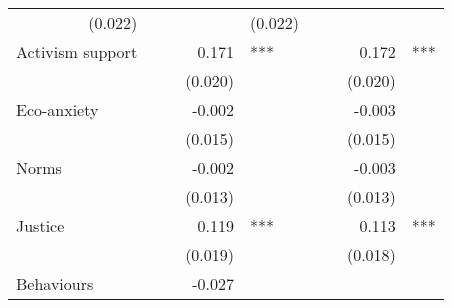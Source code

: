 \documentclass{article}
\begin{document}
\begin{table}[!h]
\begin{tabular}{lllllllll}
  \multicolumn{1}{r}{(0.022)} &
  \multicolumn{1}{l}{} &
  \multicolumn{1}{r}{} &
  \multicolumn{1}{l}{} &
  \multicolumn{1}{r}{(0.022)} &
  \multicolumn{1}{l}{} \\
\multicolumn{1}{l}{Activism support} &
  \multicolumn{1}{r}{} &
  \multicolumn{1}{l}{} &
  \multicolumn{1}{r}{0.171} &
  \multicolumn{1}{l}{***} &
  \multicolumn{1}{r}{} &
  \multicolumn{1}{l}{} &
  \multicolumn{1}{r}{0.172} &
  \multicolumn{1}{l}{***} \\
\multicolumn{1}{l}{} &
  \multicolumn{1}{r}{} &
  \multicolumn{1}{l}{} &
  \multicolumn{1}{r}{(0.020)} &
  \multicolumn{1}{l}{} &
  \multicolumn{1}{r}{} &
  \multicolumn{1}{l}{} &
  \multicolumn{1}{r}{(0.020)} &
  \multicolumn{1}{l}{} \\
\multicolumn{1}{l}{Eco-anxiety} &
  \multicolumn{1}{r}{} &
  \multicolumn{1}{l}{} &
  \multicolumn{1}{r}{-0.002} &
  \multicolumn{1}{l}{} &
  \multicolumn{1}{r}{} &
  \multicolumn{1}{l}{} &
  \multicolumn{1}{r}{-0.003} &
  \multicolumn{1}{l}{} \\
\multicolumn{1}{l}{} &
  \multicolumn{1}{r}{} &
  \multicolumn{1}{l}{} &
  \multicolumn{1}{r}{(0.015)} &
  \multicolumn{1}{l}{} &
  \multicolumn{1}{r}{} &
  \multicolumn{1}{l}{} &
  \multicolumn{1}{r}{(0.015)} &
  \multicolumn{1}{l}{} \\
\multicolumn{1}{l}{Norms} &
  \multicolumn{1}{r}{} &
  \multicolumn{1}{l}{} &
  \multicolumn{1}{r}{-0.002} &
  \multicolumn{1}{l}{} &
  \multicolumn{1}{r}{} &
  \multicolumn{1}{l}{} &
  \multicolumn{1}{r}{-0.003} &
  \multicolumn{1}{l}{} \\
\multicolumn{1}{l}{} &
  \multicolumn{1}{r}{} &
  \multicolumn{1}{l}{} &
  \multicolumn{1}{r}{(0.013)} &
  \multicolumn{1}{l}{} &
  \multicolumn{1}{r}{} &
  \multicolumn{1}{l}{} &
  \multicolumn{1}{r}{(0.013)} &
  \multicolumn{1}{l}{} \\
\multicolumn{1}{l}{Justice} &
  \multicolumn{1}{r}{} &
  \multicolumn{1}{l}{} &
  \multicolumn{1}{r}{0.119} &
  \multicolumn{1}{l}{***} &
  \multicolumn{1}{r}{} &
  \multicolumn{1}{l}{} &
  \multicolumn{1}{r}{0.113} &
  \multicolumn{1}{l}{***} \\
\multicolumn{1}{l}{} &
  \multicolumn{1}{r}{} &
  \multicolumn{1}{l}{} &
  \multicolumn{1}{r}{(0.019)} &
  \multicolumn{1}{l}{} &
  \multicolumn{1}{r}{} &
  \multicolumn{1}{l}{} &
  \multicolumn{1}{r}{(0.018)} &
  \multicolumn{1}{l}{} \\
\multicolumn{1}{l}{Behaviours} &
  \multicolumn{1}{r}{} &
  \multicolumn{1}{l}{} &
  \multicolumn{1}{r}{-0.027} &
  \multicolumn{1}{l}{} &

\end{tabular}
\end{table}
\end{document}
